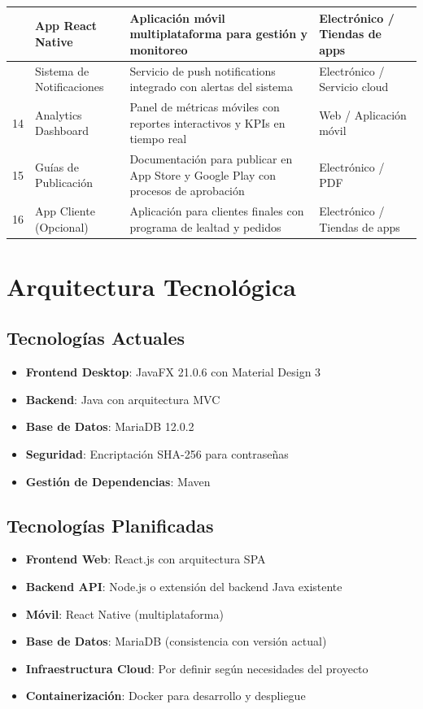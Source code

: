 \documentclass[12pt,letterpaper]{article}
\begin{document}
\begin{longtable}{|>{\centering}p{1cm}|p{6cm}|p{8cm}|>{\centering\arraybackslash}p{3cm}|}
12 & App React Native & Aplicación móvil multiplataforma para gestión y monitoreo & Electrónico / Tiendas de apps \\
\hline

13 & Sistema de Notificaciones & Servicio de push notifications integrado con alertas del sistema & Electrónico / Servicio cloud \\
\hline

14 & Analytics Dashboard & Panel de métricas móviles con reportes interactivos y KPIs en tiempo real & Web / Aplicación móvil \\
\hline

15 & Guías de Publicación & Documentación para publicar en App Store y Google Play con procesos de aprobación & Electrónico / PDF \\
\hline

16 & App Cliente (Opcional) & Aplicación para clientes finales con programa de lealtad y pedidos & Electrónico / Tiendas de apps \\
\hline
\end{longtable}

\section{Arquitectura Tecnológica}

\subsection{Tecnologías Actuales}
\begin{itemize}
    \item \textbf{Frontend Desktop}: JavaFX 21.0.6 con Material Design 3
    \item \textbf{Backend}: Java con arquitectura MVC
    \item \textbf{Base de Datos}: MariaDB 12.0.2
    \item \textbf{Seguridad}: Encriptación SHA-256 para contraseñas
    \item \textbf{Gestión de Dependencias}: Maven
\end{itemize}

\subsection{Tecnologías Planificadas}
\begin{itemize}
    \item \textbf{Frontend Web}: React.js con arquitectura SPA
    \item \textbf{Backend API}: Node.js o extensión del backend Java existente
    \item \textbf{Móvil}: React Native (multiplataforma)
    \item \textbf{Base de Datos}: MariaDB (consistencia con versión actual)
    \item \textbf{Infraestructura Cloud}: Por definir según necesidades del proyecto
    \item \textbf{Containerización}: Docker para desarrollo y despliegue
\end{itemize}
\end{document}
